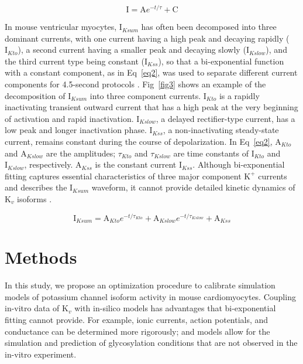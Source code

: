 \documentclass[10pt,letterpaper]{article}
\begin{document}
\begin{equation}
    \text{I} = \text{A}e^{-t/\tau} + \text{C}
    \label{eq1}
\end{equation}

In mouse ventricular myocytes, $\text{I}_{Ksum}$ has often been decomposed into three dominant currents, with one current having a high peak and decaying rapidly ($\text{I}_{Kto}$), a second current having a smaller peak and decaying slowly ($\text{I}_{Kslow}$), and the third current type being constant ($\text{I}_{Kss}$), so that a bi-exponential function with a constant component, as in Eq~\ref{eq2}, was used to separate different current components for 4.5-second protocols \cite{ednie2015reduced}. Fig~\ref{fig3} shows an example of the decomposition of $\text{I}_{Ksum}$ into three component currents. $\text{I}_{Kto}$ is a rapidly inactivating transient outward current that has a high peak at the very beginning of activation and rapid inactivation. $\text{I}_{Kslow}$, a delayed rectifier-type current, has a low peak and longer inactivation phase. $\text{I}_{Kss}$, a non-inactivating steady-state current, remains constant during the course of depolarization. In Eq~\ref{eq2}, $\text{A}_{Kto}$ and $\text{A}_{Kslow}$ are the amplitudes; $\tau_{Kto}$ and $\tau_{Kslow}$ are time constants of $\text{I}_{Kto}$ and $\text{I}_{Kslow}$, respectively. $\text{A}_{Kss}$ is the constant current $\text{I}_{Kss}$. Although bi-exponential fitting captures essential characteristics of three major component $\text{K}^{+}$ currents and describes the $\text{I}_{Ksum}$ waveform, it cannot provide detailed kinetic dynamics of $\text{K}_{v}$ isoforms \cite{plumlee2016calibrating}. 

\begin{equation}
    \text{I}_{Ksum} = \text{A}_{Kto} e^{-t/\tau_{Kto}} + \text{A}_{Kslow} e^{-t/\tau_{Kslow}} + \text{A}_{Kss}
    \label{eq2}
\end{equation}

\section*{Methods}
In this study, we propose an optimization procedure to calibrate simulation models of potassium channel isoform activity in mouse cardiomyocytes. Coupling in-vitro data of $\text{K}_{v}$ with in-silico models has advantages that bi-exponential fitting cannot provide. For example, ionic currents, action potentials, and conductance can be determined more rigorously; and models allow for the simulation and prediction of glycosylation conditions that are not observed in the in-vitro experiment. 
\end{document}
